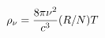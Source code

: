 \documentclass[preview]{standalone}
\begin{document}
\begin{align*}
\rho_{\nu} = { 8\pi\nu^{2} \over c^{3} } (R / N)T
\end{align*}
\end{document}
